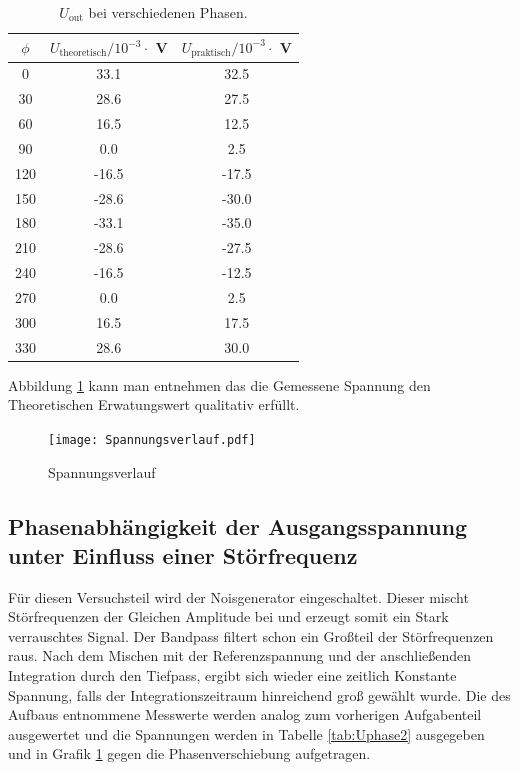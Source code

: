 \begin{table}
  \centering
  \begin{tabular}{c c c}
    \toprule
    $\phi$ & $U_{\text{theoretisch}} / 10^{-3} \cdot $ V & $U_{\text{praktisch}} / 10^{-3} \cdot $ V \\
    \midrule
    0	  &  33.1  &  32.5	\\
    30	&  28.6  &  27.5	\\
    60	&  16.5  &  12.5	\\
    90	&  0.0 	 &   2.5	\\
    120	& -16.5  & -17.5	\\
    150	& -28.6  & -30.0	\\
    180	& -33.1  & -35.0	\\
    210	& -28.6  & -27.5	\\
    240	& -16.5  & -12.5	\\
    270	&  0.0 	 &  2.5	 	\\
    300	&  16.5  &  17.5	\\
    330	&  28.6	 &  30.0	\\
  \end{tabular}
  \caption{$U_{\text{out}}$ bei verschiedenen Phasen.}
  \label{tab:Uphase}
\end{table}
Abbildung \ref{fig:Spannungsverlauf} kann man entnehmen das die Gemessene Spannung den Theoretischen Erwatungswert qualitativ erfüllt.
\begin{figure}
  \centering
  \texttt{[image: Spannungsverlauf.pdf]}
  \caption{Spannungsverlauf}
  \label{fig:Spannungsverlauf}
\end{figure}
\subsection{Phasenabhängigkeit der Ausgangsspannung unter Einfluss einer Störfrequenz}
Für diesen Versuchsteil wird der Noisgenerator eingeschaltet. Dieser mischt Störfrequenzen der Gleichen Amplitude bei und erzeugt somit ein Stark verrauschtes Signal. Der Bandpass filtert schon ein Großteil der Störfrequenzen raus. Nach dem Mischen mit der Referenzspannung und der anschließenden Integration durch den Tiefpass, ergibt sich wieder eine zeitlich Konstante Spannung, falls der Integrationszeitraum hinreichend groß gewählt wurde. Die des Aufbaus entnommene Messwerte werden analog zum vorherigen Aufgabenteil ausgewertet und die Spannungen werden in Tabelle \ref{tab:Uphase2} ausgegeben und in Grafik \ref{fig:Spannungsverlauf} gegen die Phasenverschiebung aufgetragen.

